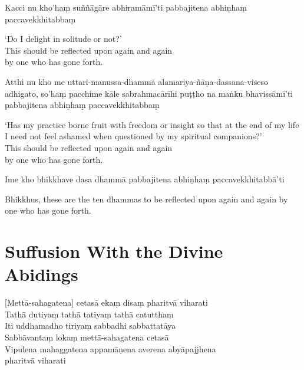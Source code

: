 Kacci nu kho'haṃ suññāgāre abhiramāmī'ti pabbajitena abhiṇhaṃ paccavekkhitabbaṃ

\begin{english}
  `Do I delight in solitude or not?'\\
  This should be reflected upon again and again\\
  by one who has gone forth.
\end{english}

Atthi nu kho me uttari-manussa-dhammā alamariya-ñāṇa-dassana-viseso adhigato, so'haṃ pacchime kāle sabrahmacārīhi puṭṭho na maṅku bhavissāmī'ti pabbajitena abhiṇhaṃ paccavekkhitabbaṃ

\begin{english}
  `Has my practice borne fruit with freedom or insight so that at the end of my life I need not feel ashamed when questioned by my spiritual companions?'\\
  This should be reflected upon again and again\\
  by one who has gone forth.
\end{english}

Ime kho bhikkhave dasa dhammā pabbajitena abhiṇhaṃ paccavekkhitabbā'ti

\begin{english}
  Bhikkhus, these are the ten dhammas to be reflected upon again and again by one who has gone forth.
\end{english}


\section{Suffusion With the Divine Abidings}


\begin{leader}
\end{leader}

[Mettā-sahagatena] cetasā ekaṃ disaṃ pharitvā viharati\\
Tathā dutiyaṃ tathā tatiyaṃ tathā catutthaṃ\\
Iti uddhamadho tiriyaṃ sabbadhi sabbattatāya\\
Sabbāvantaṃ lokaṃ mettā-sahagatena cetasā\\
Vipulena mahaggatena appamāṇena averena abyāpajjhena\\
\vin pharitvā viharati

